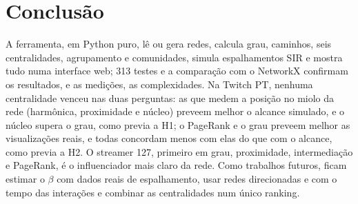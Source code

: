 \section{Conclusão}\label{sec:conclusao}

A ferramenta, em Python puro, lê ou gera redes, calcula grau, caminhos, seis centralidades,
agrupamento e comunidades, simula espalhamentos SIR e mostra tudo numa interface web; 313 testes e a
comparação com o NetworkX confirmam os resultados, e as medições, as complexidades. Na Twitch PT, nenhuma centralidade venceu nas duas perguntas: as que medem a posição
no miolo da rede (harmônica, proximidade e núcleo) preveem melhor o alcance simulado, e o núcleo
supera o grau, como previa a H1; o PageRank e o grau preveem melhor as visualizações reais, e todas
concordam menos com elas do que com o alcance, como previa a H2. O streamer 127, primeiro em grau,
proximidade, intermediação e PageRank, é o influenciador mais claro da rede. Como trabalhos futuros,
ficam estimar o $\beta$ com dados reais de espalhamento, usar redes direcionadas e com o tempo das
interações e combinar as centralidades num único ranking.
